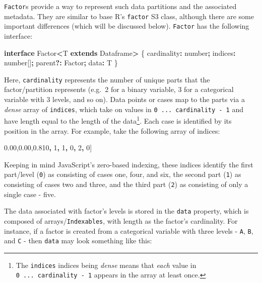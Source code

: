 \documentclass[
  openany]{book}
\newenvironment{Shaded}{\begin{snugshade}}{\end{snugshade}}
\newcommand{\DataTypeTok}[1]{\textcolor[rgb]{0.13,0.29,0.53}{#1}}
\newcommand{\DecValTok}[1]{\textcolor[rgb]{0.00,0.00,0.81}{#1}}
\newcommand{\KeywordTok}[1]{\textcolor[rgb]{0.13,0.29,0.53}{\textbf{#1}}}
\newcommand{\NormalTok}[1]{#1}
\newcommand{\OperatorTok}[1]{\textcolor[rgb]{0.81,0.36,0.00}{\textbf{#1}}}
\theoremstyle{definition}
\theoremstyle{definition}
\theoremstyle{definition}
\theoremstyle{definition}
\theoremstyle{remark}
\begin{document}
\texttt{Factor}s provide a way to represent such data partitions and the associated metadata. They are similar to base R's \texttt{factor} S3 class, although there are some important differences (which will be discussed below). \texttt{Factor} has the following interface:

\begin{Shaded}
\begin{Highlighting}[]
\KeywordTok{interface}\NormalTok{ Factor}\OperatorTok{\textless{}}\NormalTok{T }\KeywordTok{extends}\NormalTok{ Dataframe}\OperatorTok{\textgreater{}}\NormalTok{ \{}
\NormalTok{  cardinality}\OperatorTok{:} \DataTypeTok{number}\OperatorTok{;}
\NormalTok{  indices}\OperatorTok{:} \DataTypeTok{number}\NormalTok{[]}\OperatorTok{;}
\NormalTok{  parent}\OperatorTok{?:}\NormalTok{ Factor}\OperatorTok{;}
\NormalTok{  data}\OperatorTok{:}\NormalTok{ T}
\NormalTok{\}}
\end{Highlighting}
\end{Shaded}

Here, \texttt{cardinality} represents the number of unique parts that the factor/partition represents (e.g.~2 for a binary variable, 3 for a categorical variable with 3 levels, and so on). Data points or cases map to the parts via a \emph{dense} array of \texttt{indices}, which take on values in \texttt{0\ ...\ cardinality\ -\ 1} and have length equal to the length of the data\footnote{The \texttt{indices} indices being \emph{dense} means that \emph{each} value in \texttt{0\ ...\ cardinality\ -\ 1} appears in the array at least once.}. Each case is identified by its position in the array. For example, take the following array of indices:

\begin{Shaded}
\begin{Highlighting}[]
\NormalTok{[}\DecValTok{0}\OperatorTok{,} \DecValTok{1}\OperatorTok{,} \DecValTok{1}\OperatorTok{,} \DecValTok{0}\OperatorTok{,} \DecValTok{2}\OperatorTok{,} \DecValTok{0}\NormalTok{]}
\end{Highlighting}
\end{Shaded}

Keeping in mind JavaScript's zero-based indexing, these indices identify the first part/level (\texttt{0}) as consisting of cases one, four, and six, the second part (\texttt{1}) as consisting of cases two and three, and the third part (\texttt{2}) as consisting of only a single case - five.

The data associated with factor's levels is stored in the \texttt{data} property, which is composed of arrays/\texttt{Indexables}, with length as the factor's cardinality. For instance, if a factor is created from a categorical variable with three levels - \texttt{A}, \texttt{B}, and \texttt{C} - then \texttt{data} may look something like this:
\end{document}
